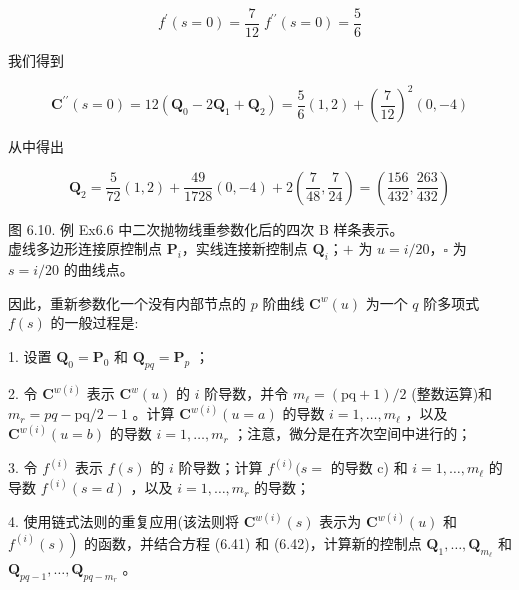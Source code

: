 \documentclass[../main.tex]{subfiles}
\begin{document}
\[
{f}^{\prime }\left( {s = 0}\right)  = \frac{7}{12}\;{f}^{\prime \prime }\left( {s = 0}\right)  = \frac{5}{6}
\]

我们得到

\[
{\mathbf{C}}^{\prime \prime }\left( {s = 0}\right)  = {12}\left( {{\mathbf{Q}}_{0} - 2{\mathbf{Q}}_{1} + {\mathbf{Q}}_{2}}\right)  = \frac{5}{6}\left( {1,2}\right)  + {\left( \frac{7}{12}\right) }^{2}\left( {0, - 4}\right)
\]

从中得出

\[
{\mathbf{Q}}_{2} = \frac{5}{72}\left( {1,2}\right)  + \frac{49}{1728}\left( {0, - 4}\right)  + 2\left( {\frac{7}{48},\frac{7}{24}}\right)  = \left( {\frac{156}{432},\frac{263}{432}}\right)
\]

\begin{center}
\begin{minipage}{18cm}
\vspace*{.6\baselineskip}
\centering
{}
\par\smallskip
图 6.10. 例 Ex6.6 中二次抛物线重参数化后的四次 B 样条表示。\\
虚线多边形连接原控制点 $\mathbf P_i$，实线连接新控制点 $\mathbf Q_i$；$+$ 为 $u=i/20$，$\square$ 为 $s=i/20$ 的曲线点。
\end{minipage}
\end{center}

因此，重新参数化一个没有内部节点的 \(p\) 阶曲线 \({\mathbf{C}}^{w}\left( u\right)\) 为一个 \(q\) 阶多项式 \(f\left( s\right)\) 的一般过程是:

1. 设置 \({\mathbf{Q}}_{0} = {\mathbf{P}}_{0}\) 和 \({\mathbf{Q}}_{pq} = {\mathbf{P}}_{p}\) ；

2. 令 \({\mathbf{C}}^{w\left( i\right) }\) 表示 \({\mathbf{C}}^{w}\left( u\right)\) 的 \(i\) 阶导数，并令 \({m}_{\ell } = \left( {\mathrm{{pq}} + 1}\right) /2\) (整数运算)和 \({m}_{r} = {pq} - \mathrm{{pq}}/2 - 1\) 。计算 \({\mathbf{C}}^{w\left( i\right) }\left( {u = a}\right)\) 的导数 \(i = 1,\ldots ,{m}_{\ell }\) ，以及 \({\mathbf{C}}^{w\left( i\right) }\left( {u = b}\right)\) 的导数 \(i = 1,\ldots ,{m}_{r}\) ；注意，微分是在齐次空间中进行的；

3. 令 \({f}^{\left( i\right) }\) 表示 \(f\left( s\right)\) 的 \(i\) 阶导数；计算 \({f}^{\left( i\right) }(s =\) 的导数 c) 和 \(i = 1,\ldots ,{m}_{\ell }\) 的导数 \({f}^{\left( i\right) }\left( {s = d}\right)\) ，以及 \(i = 1,\ldots ,{m}_{r}\) 的导数；

4. 使用链式法则的重复应用(该法则将 \({\mathbf{C}}^{w\left( i\right) }\left( s\right)\) 表示为 \({\mathbf{C}}^{w\left( i\right) }\left( u\right)\) 和 \(\left. {{f}^{\left( i\right) }\left( s\right) }\right)\) 的函数，并结合方程 (6.41) 和 (6.42)，计算新的控制点 \({\mathbf{Q}}_{1},\ldots ,{\mathbf{Q}}_{{m}_{\ell }}\) 和 \({\mathbf{Q}}_{{pq} - 1},\ldots ,{\mathbf{Q}}_{{pq} - {m}_{r}}\) 。
\end{document}
